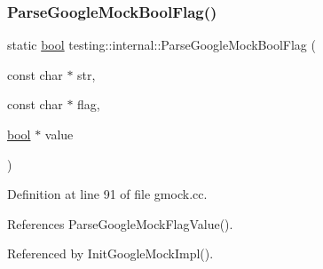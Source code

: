 \subsubsection{\texorpdfstring{Parse\+Google\+Mock\+Bool\+Flag()}{ParseGoogleMockBoolFlag()}}
{\footnotesize\ttfamily static \hyperlink{classbool}{bool} testing\+::internal\+::\+Parse\+Google\+Mock\+Bool\+Flag (\begin{DoxyParamCaption}\item[{const char $\ast$}]{str,  }\item[{const char $\ast$}]{flag,  }\item[{\hyperlink{classbool}{bool} $\ast$}]{value }\end{DoxyParamCaption})\hspace{0.3cm}{\ttfamily [static]}}



Definition at line 91 of file gmock.\+cc.



References Parse\+Google\+Mock\+Flag\+Value().



Referenced by Init\+Google\+Mock\+Impl().


